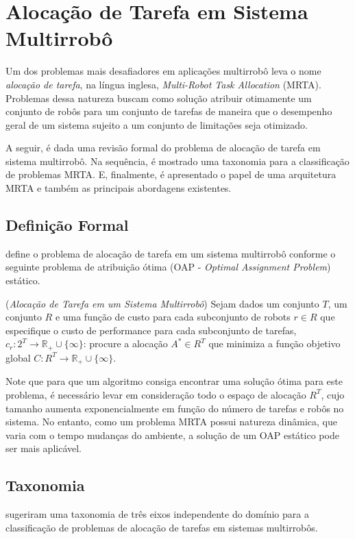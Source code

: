     \section{Alocação de Tarefa em Sistema Multirrobô} \label{sec:mrta}
        Um dos problemas mais desafiadores em aplicações multirrobô leva o nome \textit{alocação de tarefa}, na língua inglesa, \textit{Multi-Robot Task Allocation} (MRTA). Problemas dessa natureza buscam como solução atribuir otimamente um conjunto de robôs para um conjunto de tarefas de maneira que o desempenho geral de um sistema sujeito a um conjunto de limitações seja otimizado.
        
        A seguir, é dada uma revisão formal do problema de alocação de tarefa em sistema multirrobô. Na sequência, é mostrado uma taxonomia para a classificação de problemas MRTA. E, finalmente, é apresentado o papel de uma arquitetura MRTA e também as principais abordagens existentes.
        
        \subsection{Definição Formal} \label{subsec:mrta_formal}
             define o problema de alocação de tarefa em um sistema multirrobô conforme o seguinte problema de atribuição ótima (OAP - \textit{Optimal Assignment Problem}) estático.
            
            \begin{definicao} \label{def:mrta}
                (\textit{Alocação de Tarefa em um Sistema Multirrobô})
                Sejam dados um conjunto $T$, um conjunto $R$ e uma função de custo para cada subconjunto de robots $r \in R$ que especifique o custo de performance para cada subconjunto de tarefas, $c_r : 2^T \to \mathbb{R}_+\cup\{\infty\}$: procure a alocação $A^* \in R^T$ que minimiza a função objetivo global $C : R^T \to \mathbb{R}_+\cup\{\infty\}$.
            \end{definicao}
        
            Note que para que um algoritmo consiga encontrar uma solução ótima para este problema, é necessário levar em consideração todo o espaço de alocação $R^T$, cujo tamanho aumenta exponencialmente em função do número de tarefas e robôs no sistema. No entanto, como um problema MRTA possui natureza dinâmica, que varia com o tempo mudanças do ambiente, a solução de um OAP estático pode ser mais aplicável.
    
        \subsection{Taxonomia} \label{subsec:taxonomia_mrta}
             sugeriram uma taxonomia de três eixos independente do domínio para a classificação de problemas de alocação de tarefas em sistemas multirrobôs. 
            
